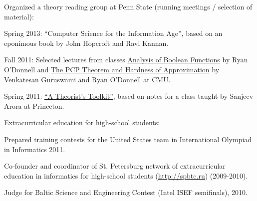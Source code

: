 \documentclass[11pt]{article}
\renewcommand{\section}[2]%
        {\pagebreak[2]\vspace{1.3\baselineskip}%
         \phantomsection\addcontentsline{toc}{section}{#1}%
         \hspace{0in}%
         \marginpar{
         \raggedright \scshape #1}#2}
\newenvironment{innerlist}[1][\enskip\textbullet]%
        {\begin{compactitem}[#1]}{\end{compactitem}}
\newcommand{\blankline}{\quad\pagebreak[2]}
\begin{document}
Organized a theory reading group at Penn State (running meetings / selection of material):
\begin{innerlist}
 \item Spring 2013: ``Computer Science for the Information Age'', based on an eponimous book by John Hopcroft and Ravi Kannan.
 \item Fall 2011: Selected lectures from classes \href{http://www.cs.cmu.edu/~odonnell/boolean-analysis/}{Analysis of Boolean Functions} by Ryan O'Donnell and \href{http://www.cs.washington.edu/education/courses/cse533/05au/}{The PCP Theorem and Hardness of Approximation} by Venkatesan Guruswami and Ryan O'Donnell at CMU.
  \item Spring 2011: \href{http://www.cs.princeton.edu/courses/archive/fall02/cs597D/}{``A Theorist's Toolkit''}, based on notes for a class taught by Sanjeev Arora at Princeton.
\end{innerlist}

\blankline

Extracurricular education for high-school students:

\begin{innerlist}
\item Prepared training contests for the United States team in International Olympiad in Informatics 2011.

\item Co-founder and coordinator of St. Petersburg network of extracurricular education in informatics for high-school students (\href{http://spbtc.ru}{http://spbtc.ru}) (2009-2010).

\item Judge for Baltic Science and Engineering Contest (Intel ISEF semifinals), 2010.
\
\end{innerlist}


\begin{comment}

\section{Teaching}
Course teacher in Olympiad Programming in Physical-Technical Lyceum, St. Petersburg (2005 - 2010).

\blankline

Course teacher in Summer Informatics School for winners of the All-Russian Olympiad in Informatics and Programming (2008), visiting lecturer (2009-2010).

\blankline

Course teacher in St. Petersburg Training Camp for winners of St. Petersburg Olympiad in Informatics for School Students (2008).

\end{comment}
\end{document}
